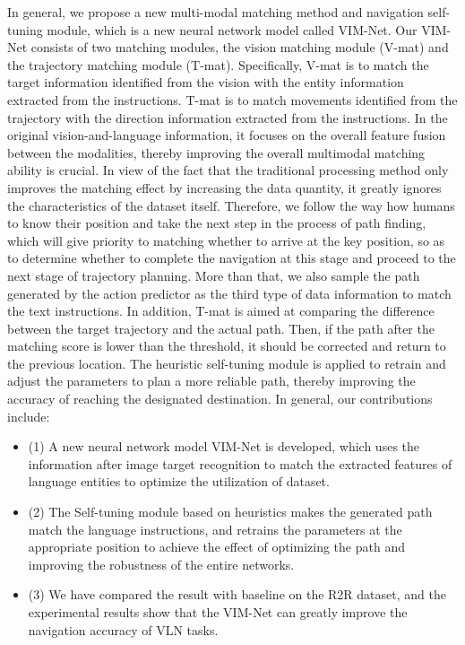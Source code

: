 In general, we propose a new multi-modal matching method and navigation self-tuning module, which is a new neural network model called VIM-Net. Our VIM-Net consists of two matching modules, the vision matching module (V-mat) and the trajectory matching module (T-mat). Specifically, V-mat is to match the target information identified from the vision with the entity information extracted from the instructions. T-mat is to match movements identified from the trajectory with the direction information extracted from the instructions. In the original vision-and-language information, it focuses on the overall feature fusion between the modalities, thereby improving the overall multimodal matching ability is crucial. In view of the fact that the traditional processing method only improves the matching effect by increasing the data quantity, it greatly ignores the characteristics of the dataset itself. Therefore, we follow the way how humans to know their position and take the next step in the process of path finding, which will give priority to matching whether to arrive at the key position, so as to determine whether to complete the navigation at this stage and proceed to the next stage of trajectory planning. More than that, we also sample the path generated by the action predictor as the third type of data information to match the text instructions. In addition, T-mat is aimed at comparing the difference between the target trajectory and the actual path. Then, if the path after the matching score is lower than the threshold, it should be corrected and return to the previous location. The heuristic self-tuning module is applied to retrain and adjust the parameters to plan a more reliable path, thereby improving the accuracy of reaching the designated destination. In general, our contributions include:

\begin{itemize}
		\item[](1) A new neural network model VIM-Net is developed, which uses the information after image target recognition to match the extracted features of language entities to optimize the utilization of dataset.
		\item[](2) The Self-tuning module based on heuristics makes the generated path match the language instructions, and retrains the parameters at the appropriate position to achieve the effect of optimizing the path and improving the robustness of the entire networks.
		\item[](3) We have compared the result with baseline on the R2R dataset, and the experimental results show that the VIM-Net can greatly improve the navigation accuracy of VLN tasks.
\end{itemize}
